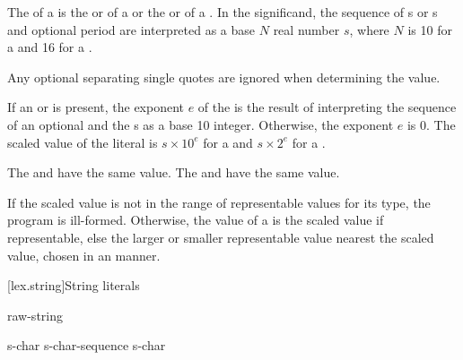 \pnum
{}%
The  of a 
is the  or 
of a 
or the 
or 
of a .
In the significand,
the sequence of s or s
and optional period are interpreted as a base $N$ real number $s$,
where $N$ is 10 for a  and
16 for a .
\begin{note}
Any optional separating single quotes are ignored when determining the value.
\end{note}
If an  or 
is present,
the exponent $e$ of the 
is the result of interpreting
the sequence of an optional  and the s
as a base 10 integer.
Otherwise, the exponent $e$ is 0.
The scaled value of the literal is
$s \times 10^e$ for a  and
$s \times 2^e$ for a .
\begin{example}
The 
 and  have the same value.
The 
 and 
have the same value.
\end{example}

\pnum
If the scaled value is not in the range of representable
values for its type, the program is ill-formed.
Otherwise, the value of a 
is the scaled value if representable,
else the larger or smaller representable value nearest the scaled value,
chosen in an  manner.

[lex.string]{String literals}

%
\begin{bnf}
\br
       \br
      raw-string
\end{bnf}

\begin{bnf}
\br
    s-char\br
    s-char-sequence s-char
\end{bnf}

